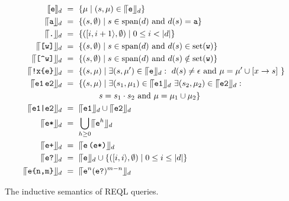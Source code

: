 \begin{table}
	\begin{align*}
		\llbracket\texttt{e}\rrbracket_{d} & \ = \  \{ \mu \mid (s, \mu) \in \llceil{\texttt{e}}\rrfloor_{d} \}\\
		\llceil{\texttt{a}}\rrfloor_{d} & \ = \  \{ (s, \emptyset) \mid s \in \text{span}(d) \text{ and } d(s) = \texttt{a} \}\\
		\llceil{\texttt{.}}\rrfloor_{d} & \ = \  \{ ([i,i+1\rangle, \emptyset) \mid 0 \leq i < |d| \}\\
		\llceil{\texttt{[w]}}\rrfloor_{d} & \ = \  \{ (s, \emptyset) \mid s \in \text{span}(d) \text{ and } d(s) \in  \text{set}(\texttt{w}) \}\\
		\llceil{\texttt{[\textasciicircum w]}}\rrfloor_{d} & \ = \  \{ (s, \emptyset) \mid s \in \text{span}(d) \text{ and } d(s) \notin  \text{set}(\texttt{w}) \}\\
		\llceil{\texttt{!x\{e\}}}\rrfloor_{d} & \ = \  \{ (s, \mu) \mid \exists (s, \mu') \in \llceil{\texttt{e}}\rrfloor_{d}: \ d(s) \neq \epsilon \text{ and }
		\mu =  \mu'  \cup [x \to s] \ \} \\
		\llceil{\texttt{e1} \, \texttt{e2}}\rrfloor_{d} & \ = \  \{ (s, \mu) \mid
		\exists (s_1, \mu_1) \in \llceil{\texttt{e1}}\rrfloor_{d} \ \exists (s_2, \mu_2) \in \llceil{\texttt{e2}}\rrfloor_{d}: \\
		& \;\;\;\;\;\;\;\;\;\;\;\;\;\;\;\; s = s_1 \cdot s_2 \text{ and } \mu = \mu_1 \cup \mu_2 \}\\
		\llceil{\texttt{e1|e2}}\rrfloor_{d} & \ = \  \llceil{\texttt{e1}}\rrfloor_{d} \cup \llceil{\texttt{e2}}\rrfloor_{d}\\
		\llceil{\texttt{e*}}\rrfloor_{d} & \ = \  \bigcup_{h\geq 0}\llceil{\texttt{e}^h}\rrfloor_{d} \\
		\llceil{\texttt{e+}}\rrfloor_{d} & \ = \  \llceil{\texttt{e}\, \texttt{(e*)}}\rrfloor_{d} \\
		\llceil{\texttt{e?}}\rrfloor_{d} & \ = \  \llceil{\texttt{e}}\rrfloor_{d} \cup \{ ([i,i\rangle, \emptyset) \mid 0 \leq i \leq |d| \}\\
		\llceil{\texttt{e\{n,m\}}}\rrfloor_{d} & \ = \  \llceil{\texttt{e}^n(\texttt{e?})^{m-n}}\rrfloor_{d}
	\end{align*}
	\vspace*{-10pt}
	\caption{The inductive semantics of REQL queries.}
	\label{tab-semantics}	
	\vspace{-5mm}
\end{table}

